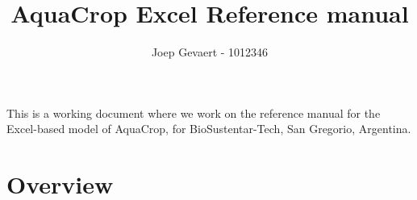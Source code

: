 \documentclass{article}
\title{AquaCrop Excel Reference manual}
\author{Joep Gevaert - 1012346}
\begin{document}
\maketitle
This is a working document where we work on the reference manual for the
Excel-based model of AquaCrop, for BioSustentar-Tech, San Gregorio, Argentina.
\section{Overview}
\end{document}
